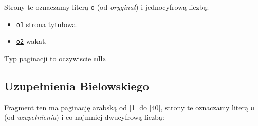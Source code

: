 \documentclass[12]{mwart}
\begin{document}
Strony te oznaczamy literą \texttt{o} (od \textit{oryginał}) i
jednocyfrową liczbą:
\begin{itemize}
\item \href{\pai{1}{5}}{\texttt{o1}}  strona tytułowa.
\item \href{\pai{1}{6}}{\texttt{o2}} wakat.
\end{itemize}

Typ paginacji to oczywiscie \textbf{nlb}.


\subsection{Uzupełnienia  Bielowskiego}
\label{sec:przedm-biel}


Fragment ten ma paginację arabską od [1] do [40], strony te oznaczamy
literą \texttt{u} (od \textit{uzupełnienia}) i co najmniej dwucyfrową
liczbą:
\end{document}
